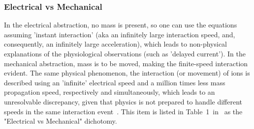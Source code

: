 \subsubsection{Electrical vs Mechanical\label{sec:Physics-ElectricalMechanical}\label{sec:Physics-SlowCurrent}}

In the electrical abstraction, no mass is present,
so one can use the equations assuming 'instant interaction' (aka an infinitely
large interaction speed, and, consequently, an infinitely
large acceleration),
which leads to non-physical explanations of the physiological observations (such as 'delayed current').
In the mechanical abstraction, mass is to be moved, 
making the finite-speed interaction evident. The same physical phenomenon,
the interaction (or movement) of ions is described using an 'infinite' electrical speed and 
a million times less mass propagation speed, respectively and simultaneously, which leads
to an unresolvable discrepancy, given that physics is not prepared to handle
different speeds in the same interaction event~\cite{VeghNon-ordinaryLaws:2025}.
This item is listed in Table~1~in~\cite{ThermodynamicAPDrukarch:2022}
as the "Electrical vs Mechanical" dichotomy.

